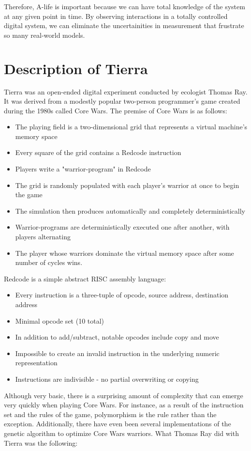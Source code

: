 \documentclass[11pt, twocolumn]{article}
\begin{document}
Therefore, A-life is important because we can have total knowledge of the system at any given point in time. By observing interactions in a totally controlled digital system, we can eliminate the uncertainities in measurement that frustrate so many real-world models.

\section{Description of Tierra}
Tierra was an open-ended digital experiment conducted by ecologist Thomas Ray. It was derived from a modestly popular two-person programmer's game created during the 1980s called Core Wars. The premise of Core Wars is as follows:

\begin{itemize}
\item The playing field is a two-dimensional grid that represents a virtual machine's memory space
\item Every square of the grid contains a Redcode instruction
\item Players write a "warrior-program" in Redcode
\item The grid is randomly populated with each player's warrior at once to begin the game
\item The simulation then produces automatically and completely deterministically
\item Warrior-programs are deterministically executed one after another, with players alternating 
\item The player whose warriors dominate the virtual memory space after some number of cycles wins.
\end{itemize}

Redcode is a simple abstract RISC assembly language:

\begin{itemize}
\item Every instruction is a three-tuple of opcode, source address, destination address
\item Minimal opcode set (10 total)
\item In addition to add/subtract, notable opcodes include copy and move
\item Impossible to create an invalid instruction in the underlying numeric representation
\item Instructions are indivisible - no partial overwriting or copying
\end{itemize}

	Although very basic, there is a surprising amount of complexity that can emerge very quickly when playing Core Wars. For instance, as a result of the instruction set and the rules of the game, polymorphism is the rule rather than the exception. Additionally, there have even been several implementations of the genetic algorithm to optimize Core Wars warriors. What Thomas Ray did with Tierra was the following: 
\end{document}
